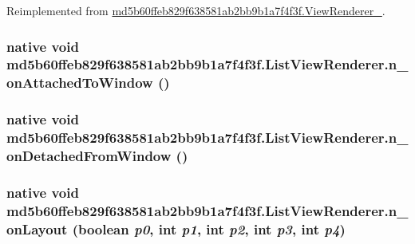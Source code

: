 Reimplemented from \hyperlink{classmd5b60ffeb829f638581ab2bb9b1a7f4f3f_1_1_view_renderer__2_dae20979ac761a65aa60c9b427509c37}{md5b60ffeb829f638581ab2bb9b1a7f4f3f.ViewRenderer\_}.\hypertarget{classmd5b60ffeb829f638581ab2bb9b1a7f4f3f_1_1_list_view_renderer_f1303a48df3b1f7253b9500e2614e515}{
\subsubsection[{n\_\-onAttachedToWindow}]{\setlength{\rightskip}{0pt plus 5cm}native void md5b60ffeb829f638581ab2bb9b1a7f4f3f.ListViewRenderer.n\_\-onAttachedToWindow ()}}
\label{classmd5b60ffeb829f638581ab2bb9b1a7f4f3f_1_1_list_view_renderer_f1303a48df3b1f7253b9500e2614e515}


\hypertarget{classmd5b60ffeb829f638581ab2bb9b1a7f4f3f_1_1_list_view_renderer_526706bd1d93c3ab40c34c2a93640b94}{
\subsubsection[{n\_\-onDetachedFromWindow}]{\setlength{\rightskip}{0pt plus 5cm}native void md5b60ffeb829f638581ab2bb9b1a7f4f3f.ListViewRenderer.n\_\-onDetachedFromWindow ()}}
\label{classmd5b60ffeb829f638581ab2bb9b1a7f4f3f_1_1_list_view_renderer_526706bd1d93c3ab40c34c2a93640b94}


\hypertarget{classmd5b60ffeb829f638581ab2bb9b1a7f4f3f_1_1_list_view_renderer_88db0ee991444107111a9da6f510dfc5}{
\subsubsection[{n\_\-onLayout}]{\setlength{\rightskip}{0pt plus 5cm}native void md5b60ffeb829f638581ab2bb9b1a7f4f3f.ListViewRenderer.n\_\-onLayout (boolean {\em p0}, \/  int {\em p1}, \/  int {\em p2}, \/  int {\em p3}, \/  int {\em p4})}}
\label{classmd5b60ffeb829f638581ab2bb9b1a7f4f3f_1_1_list_view_renderer_88db0ee991444107111a9da6f510dfc5}




